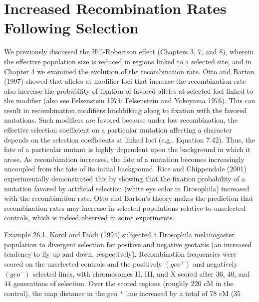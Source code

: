 \documentclass{article}
\begin{document}
\section{Increased Recombination Rates Following Selection}
We previously discussed the Hill-Robertson effect (Chapters 3, 7, and 8), wherein the effective population size is reduced in regions linked to a selected site, and in Chapter 4 we examined the evolution of the recombination rate. Otto and Barton (1997) showed that alleles at modifier loci that increase the recombination rate also increase the probability of fixation of favored alleles at selected loci linked to the modifier (also see Felsenstein 1974; Felsenstein and Yokoyama 1976). This can result in recombination modifiers hitchhiking along to fixation with the favored mutations. Such modifiers are favored because under low recombination, the effective selection coefficient on a particular mutation affecting a character depends on the selection coefficients at linked loci (e.g., Equation 7.42). Thus, the fate of a particular mutant is highly dependent upon the background in which it arose. As recombination increases, the fate of a mutation becomes increasingly uncoupled from the fate of its initial background. Rice and Chippendale (2001) experimentally demonstrated this by showing that the fixation probability of a mutation favored by artificial selection (white eye color in Drosophila) increased with the recombination rate. Otto and Barton's theory makes the prediction that recombination rates may increase in selected populations relative to unselected controls, which is indeed observed in some experiments.

Example 26.1. Korol and Iliadi (1994) subjected a Drosophila melanogaster population to divergent selection for positive and negative geotaxis (an increased tendency to fly up and down, respectively). Recombination frequencies were scored on the unselected controls and the positively  $ (geo^{+}) $ and negatively  $ (geo^{-}) $ selected lines, with chromosomes II, III, and X scored after 36, 40, and 44 generations of selection. Over the scored regions (roughly 220 cM in the control), the map distance in the geo $ ^{+} $ line increased by a total of 78 cM (35%
\end{document}
